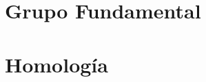 \documentclass[10pt]{report}
\begin{document}

\chapter{Grupo Fundamental}



























\chapter{Homolog\'ia}



% 
% 
% 
% 
% 
% 
% 
% 
% 
% 
% 
\end{document}
